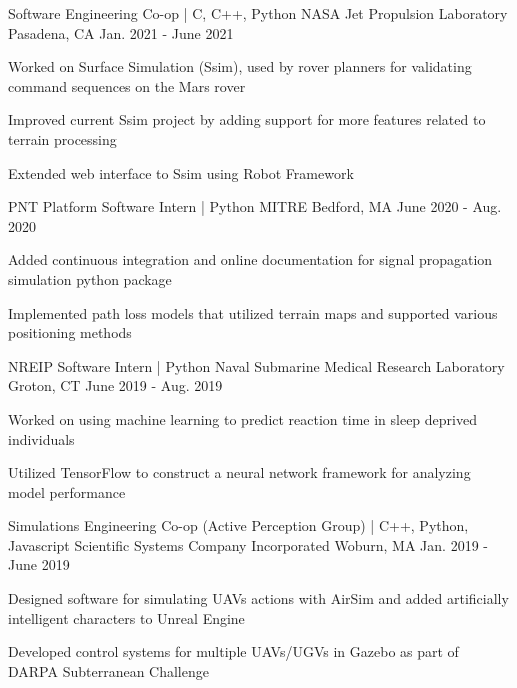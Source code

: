 
\begin{cventries}
  \cventry
    {Software Engineering Co-op | C, C++, Python} %
    {NASA Jet Propulsion Laboratory} %
    {Pasadena, CA} %
    {Jan. 2021 - June 2021} %
    {
      \begin{cvitems} %
        \item {Worked on Surface Simulation (Ssim), used by rover planners for validating command sequences on the Mars rover}
        \item {Improved current Ssim project by adding support for more features related to terrain processing}
        \item {Extended web interface to Ssim using Robot Framework}
      \end{cvitems}
    }

  \cventry
    {PNT Platform Software Intern | Python} %
    {MITRE} %
    {Bedford, MA} %
    {June 2020 - Aug. 2020} %
    {
      \begin{cvitems} %
        \item {Added continuous integration and online documentation for signal propagation 
        simulation python package}
        \item {Implemented path loss models that utilized terrain maps and supported various positioning methods}
      \end{cvitems}
    }

  \cventry
    {NREIP Software Intern | Python} %
    {Naval Submarine Medical Research Laboratory} %
    {Groton, CT} %
    {June 2019 - Aug. 2019} %
    {
      \begin{cvitems} %
        \item {Worked on using machine learning to predict reaction time in sleep deprived individuals}
        \item {Utilized TensorFlow to construct a neural network framework for analyzing model performance}
      \end{cvitems}
    }

  \cventry
    {Simulations Engineering Co-op (Active Perception Group) | C++, Python, Javascript} %
    {Scientific Systems Company Incorporated} %
    {Woburn, MA} %
    {Jan. 2019 - June 2019} %
    {
      \begin{cvitems} %
        \item {Designed software for simulating UAVs actions with AirSim and added artificially intelligent characters to Unreal Engine}
        \item {Developed control systems for multiple UAVs/UGVs in 
               Gazebo as part of DARPA Subterranean Challenge}
      \end{cvitems}
    }
\end{cventries}
